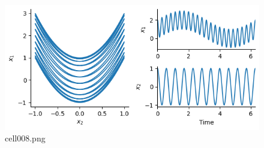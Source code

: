 \begin{figure}[ht]
	\centering
	\includegraphics[scale=0.8, max width=\linewidth]{./fig/local-learning-rule/slow-feature-analysis/cell008.png}
	\caption{cell008.png}
	\label{cell008.png}
\end{figure}